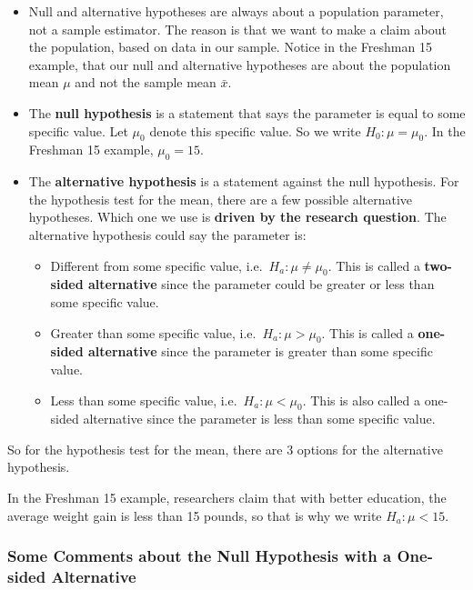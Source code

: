 \documentclass[
]{book}
\theoremstyle{definition}
\theoremstyle{definition}
\theoremstyle{definition}
\theoremstyle{definition}
\theoremstyle{remark}
\begin{document}
\begin{itemize}
\item
  Null and alternative hypotheses are always about a population parameter, not a sample estimator. The reason is that we want to make a claim about the population, based on data in our sample. Notice in the Freshman 15 example, that our null and alternative hypotheses are about the population mean \(\mu\) and not the sample mean \(\bar{x}\).
\item
  The \textbf{null hypothesis} is a statement that says the parameter is equal to some specific value. Let \(\mu_0\) denote this specific value. So we write \(H_0: \mu = \mu_0\). In the Freshman 15 example, \(\mu_0 = 15\).
\item
  The \textbf{alternative hypothesis} is a statement against the null hypothesis. For the hypothesis test for the mean, there are a few possible alternative hypotheses. Which one we use is \textbf{driven by the research question}. The alternative hypothesis could say the parameter is:

  \begin{itemize}
  \item
    Different from some specific value, i.e.~\(H_a: \mu \neq \mu_0\). This is called a \textbf{two-sided alternative} since the parameter could be greater or less than some specific value.
  \item
    Greater than some specific value, i.e.~\(H_a: \mu > \mu_0\). This is called a \textbf{one-sided alternative} since the parameter is greater than some specific value.
  \item
    Less than some specific value, i.e.~\(H_a: \mu < \mu_0\). This is also called a one-sided alternative since the parameter is less than some specific value.
  \end{itemize}
\end{itemize}

So for the hypothesis test for the mean, there are 3 options for the alternative hypothesis.

In the Freshman 15 example, researchers claim that with better education, the average weight gain is less than 15 pounds, so that is why we write \(H_a: \mu < 15\).

\hypertarget{some-comments-about-the-null-hypothesis-with-a-one-sided-alternative}{%
\subsubsection{Some Comments about the Null Hypothesis with a One-sided Alternative}\label{some-comments-about-the-null-hypothesis-with-a-one-sided-alternative}}
\end{document}
